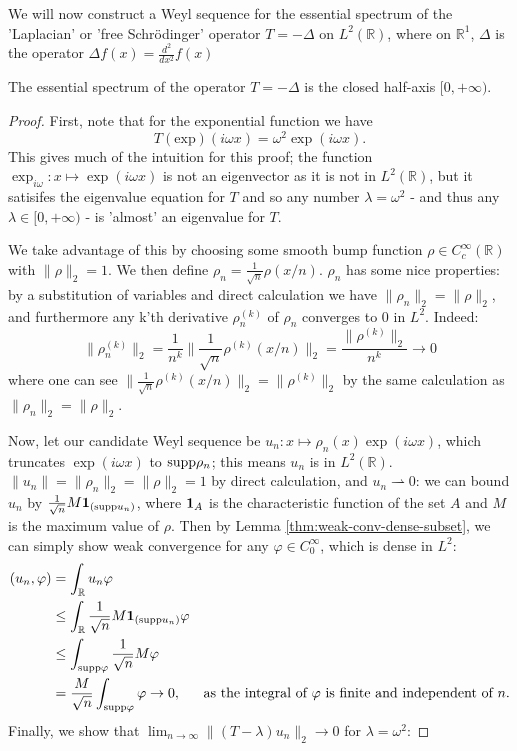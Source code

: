 \documentclass[../main.tex]{subfiles}
\begin{document}
We will now construct a Weyl sequence for the essential spectrum of the 'Laplacian' or 'free Schr\"odinger' operator $T = -\Delta$ on $L^2(\mathbb{R})$,
where on $\mathbb{R}^1$, $\Delta$ is the operator $\Delta f (x) = \frac{d^2}{dx^2} f(x)$

\begin{proposition}
The essential spectrum of the operator $T = -\Delta$ is the closed half-axis $[0, +\infty)$.
\end{proposition}
\begin{proof}
First, note that for the exponential function we have 
\begin{equation}\label{eqn:laplace-eigenvector}
T(\text{exp})(i\omega x) = \omega^2 \exp(i\omega x).
\end{equation}
This gives much of the intuition for this proof; the function $\exp_{i \omega}: x \mapsto \exp(i\omega x)$ is not an eigenvector 
as it is not in $L^2(\mathbb{R})$, but it satisifes the eigenvalue equation for $T$ and so any number $\lambda = \omega^2$ -
and thus any $\lambda \in [0, +\infty)$ - is 'almost' an eigenvalue for $T$.

We take advantage of this by choosing some smooth bump function $\rho \in C^\infty_c(\mathbb{R})$ with $\|\rho\|_2 = 1$. We
then define $\rho_n = \frac{1}{\sqrt{n}}\rho(x/n)$. $\rho_n$ has some nice properties: by a substitution of variables and direct calculation we have $\|\rho_n\|_2 = \|\rho\|_2$, and furthermore any k'th derivative $\rho_n^{(k)}$ of $\rho_n$ 
converges to 0 in $L^2$. Indeed:
\begin{equation}\label{eqn:rhokn-vanishes}
\|\rho_n^{(k)}\|_2 = \frac{1}{n^k}\|\frac{1}{\sqrt{n}}\rho^{(k)}(x/n)\|_2 = \frac{\|\rho^{(k)}\|_2}{n^k} \rightarrow 0
\end{equation}
where one can see $\|\frac{1}{\sqrt{n}}\rho^{(k)}(x/n)\|_2 = \|\rho^{(k)}\|_2$ by the same calculation as  $\|\rho_n\|_2 = \|\rho\|_2$.

Now, let our candidate Weyl sequence be $u_n: x \mapsto \rho_n(x)\exp(i\omega x)$,
which truncates $\exp(i\omega x)$ to $\mathrm{supp} \rho_n$; this means $u_n$ is in $L^2(\mathbb{R})$.
$\|u_n\| = \|\rho_n\|_2 = \|\rho\|_2 = 1$ by direct calculation, and $u_n \rightharpoonup 0$: we can bound $u_n$ by $\frac{1}{\sqrt{n}} M \mathbf{1}_{(\mathrm{supp} u_n)}$, where $\mathbf{1}_A$ is the characteristic function of the set $A$ and $M$ is the maximum value of $\rho$. Then by Lemma \ref{thm:weak-conv-dense-subset}, we can simply show weak convergence for any $\varphi \in C_0^\infty$, which is dense in $L^2$:
\begin{align*}
( u_n, \varphi ) & = \int_{\mathbb{R}}u_n \varphi & \\
& \leq \int_{\mathbb{R}} \frac{1}{\sqrt{n}} M \mathbf{1}_{(\mathrm{supp} u_n)} \varphi & \\
& \leq \int_{\mathrm{supp} \varphi} \frac{1}{\sqrt{n}} M  \varphi & \\
& = \frac{M}{\sqrt{n}} \int_{\mathrm{supp} \varphi} \varphi \rightarrow 0, & \text{as the integral of $\varphi$ is finite and independent of $n$.}
\end{align*}
Finally, we show that $\lim_{n \rightarrow \infty}\|(T - \lambda)u_n\|_2  \rightarrow 0$ for $\lambda = \omega^2$:


\end{proof}
\end{document}
